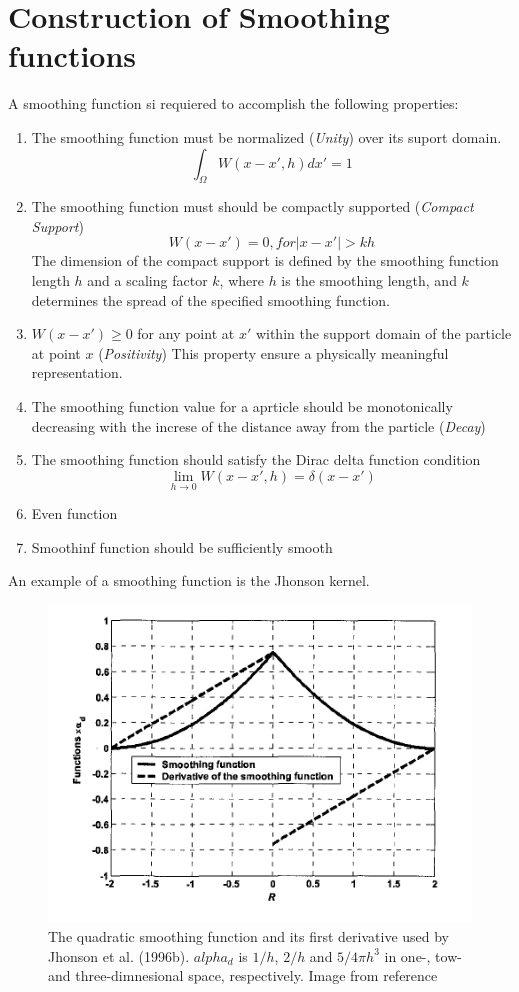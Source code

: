 \documentclass[12pt]{book}
\begin{document}
\section{Construction of Smoothing functions}
A smoothing function si requiered to accomplish the following properties:
\begin{enumerate}
\item The smoothing function must be normalized (\textit{Unity}) over its suport domain.
\[\int_{\Omega}{W(x-x',h)dx'}=1\]
\item The smoothing function must should be compactly supported (\textit{Compact Support})
\[W(x-x')=0,for|x-x'|>kh\]
The dimension of the compact support is defined by the smoothing function length $h$ and a scaling factor $k$, where $h$ is the smoothing length, and $k$ determines the spread of the specified smoothing function.
\item $W(x-x')\geq0$ for any point at $x'$ within the support domain of the particle at point $x$ (\textit{Positivity}) This property ensure a physically meaningful representation.
\item The smoothing function value for a aprticle should be monotonically decreasing with the increse of the distance away from the particle (\textit{Decay})
\item The smoothing function should satisfy the Dirac delta function condition
\[\lim_{h\to0}{W(x-x',h)}=\delta(x-x')\]
\item Even function
\item Smoothinf function should be sufficiently smooth
\end{enumerate}

An example of a smoothing function is the Jhonson kernel. 
\begin{figure}[h!]
\centering
\includegraphics[scale=.8]{./images/JohnsonKernel.png}
\caption{The quadratic smoothing function and its first derivative used by Jhonson et al. (1996b). $alpha_d$ is $1/h$, $2/h$ and $5/4\pi h^3$ in one-, tow- and three-dimnesional space, respectively. Image from reference \cite{Liu_SPH}}
\label{JohnsonKernel}
\end{figure}
\end{document}
